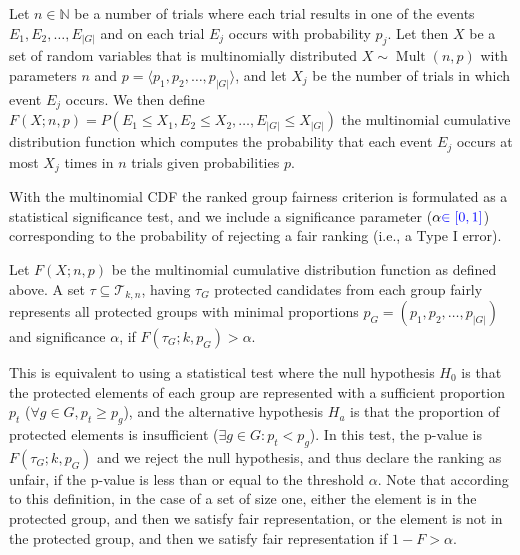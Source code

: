 \begin{definition}
	\label{def:multinomialCDF}
	Let $ n \in \mathbb{N}$ be a number of trials where each trial results in one of the events $ E_1, E_2, \ldots, E_{|G|} $ and on each trial $ E_j $ occurs with probability $ p_j $.
	Let then $X$ %
	be a set of random variables that is multinomially distributed $ X \sim \operatorname{Mult}(n, p)$ with parameters $ n $ and $ p = \langle p_1, p_2, \ldots, p_{|G|} \rangle$, and let $ X_j $ be the number of trials in which event $ E_j $ occurs.
	We then define $ F\left(X; n, p\right) = P\left(E_1 \leq X_1, E_2 \leq X_2, \ldots, E_{|G|} \leq X_{|G|}\right)$ the multinomial cumulative distribution function which computes the probability that each event $ E_j $ occurs at most $ X_j $ times in $ n $ trials given probabilities $ p $.
\end{definition}
With the multinomial CDF the ranked group fairness criterion is formulated as a statistical significance test, and we include a significance parameter ($\alpha \textcolor[rgb]{0.00,0.00,1.00}{\in [0,1]}$) corresponding to the probability of rejecting a fair ranking (i.e., a Type I error).

\begin{definition}
	\label{def:fair-representation-condition}
	Let $F(X;n,p)$ be the multinomial cumulative distribution function as defined above.
	A set $\tau \subseteq \mathcal{T}_{k,n}$, having $\tau_G$ protected candidates from each group fairly represents all protected groups with minimal proportions $p_G = (p_1, p_2, \ldots, p_{|G|})$ and significance $\alpha$,
	if $F(\tau_G;k,p_G) > \alpha$.
\end{definition}

This is equivalent to using a statistical test where the null hypothesis $H_0$ is that the protected elements of each group are represented with a sufficient proportion $p_t$ ($\forall g \in G, p_t \ge p_g$), and the alternative hypothesis $H_a$ is that the proportion of protected elements is insufficient ($\exists g \in G: p_t < p_g$). In this test, the p-value is $F(\tau_G; k, p_G)$ and we reject the null hypothesis, and thus declare the ranking as unfair, if the p-value is less than or equal to the threshold $\alpha$.
%
Note that according to this definition, in the case of a set of size one, either the element is in the protected group, and then we satisfy fair representation, or the element is not in the protected group, and then we satisfy fair representation if $1 - F > \alpha$.

